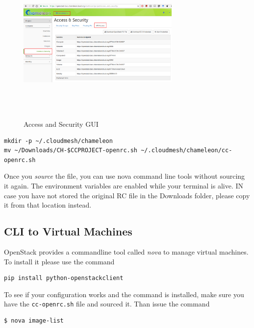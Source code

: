 \begin{figure}[!htbp]
  \centering 
  \includegraphics[width=8cm,height=8cm]{section/cloud/chameleon/images/openstack-chameleon-openrc.png}
  \caption{Access and Security GUI}
  \label{F:cc-gui}
\end{figure}


\begin{lstlisting}
mkdir -p ~/.cloudmesh/chameleon
mv ~/Downloads/CH-$CCPROJECT-openrc.sh ~/.cloudmesh/chameleon/cc-openrc.sh
\end{lstlisting}

Once you \textit{source} the file, you can use nova command line tools
without sourcing it again.  The environment variables are enabled
while your terminal is alive. IN case you have not stored the original
RC file in the Downloads folder, please copy it from that location
instead.

\subsection{CLI to Virtual Machines}

OpenStack provides a commandline tool called \textit{nova} to manage
virtual machines. To install it please use the command

\begin{lstlisting}
pip install python-openstackclient
\end{lstlisting}

To see if your configuration works and the command is installed, make
sure you have the \verb|cc-openrc.sh| file and sourced it. Than issue
the command

\begin{lstlisting}
$ nova image-list
\end{lstlisting}

